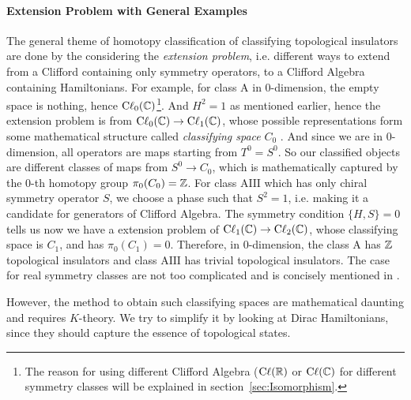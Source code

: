 \paragraph{Extension Problem with General Examples}
The general theme of homotopy classification of classifying topological
insulators are done by the considering the \textit{extension problem}, i.e.
different ways to extend from a Clifford containing only symmetry operators, to
a Clifford Algebra containing Hamiltonians. For example, for class $\mathrm{A}$
in $0$-dimension, the empty space is nothing, hence
$\mathrm{C\ell}_{0}(\mathbb{C})$\footnote{The reason for using different Clifford
Algebra ($\mathrm{C\ell}(\mathbb{R})$ or $\mathrm{C\ell}(\mathbb{C})$ for different symmetry
classes will be explained in section~\ref{sec:Isomorphism}.}. And $H^2=1$ as
mentioned earlier, hence the extension problem is from
$\mathrm{C\ell}_{0}(\mathbb{C})\to \mathrm{C\ell}_{1}(\mathbb{C})$, whose possible
representations form some mathematical structure called \textit{classifying
space} $C_0$ \cite{Morimoto2013}. And since we are in $0$-dimension, all
operators are maps starting from $T^0=S^0$. So our classified objects are
different classes of maps from $S^0\to C_0$, which is mathematically captured by
the $0$-th homotopy group $\pi_0(C_0)=\mathbb{Z}$. For class $\mathrm{AIII}$ which has
only chiral symmetry operator $S$, we choose a phase such that $S^2=1$, i.e.
making it a candidate for generators of Clifford Algebra. The symmetry condition
$\{H,S\}=0$ tells us now we have a extension problem of
$\mathrm{C\ell}_{1}(\mathbb{C})\to \mathrm{C\ell}_{2}(\mathbb{C})$, whose classifying space is
$C_1$, and has $\pi_0(C_1)=0$. Therefore, in $0$-dimension, the class
$\mathrm{A}$ has $\mathbb{Z}$ topological insulators and class $\mathrm{AIII}$ has
trivial topological insulators. The case for real symmetry classes are not too
complicated and is concisely mentioned in \cite{Morimoto2013}.

However, the method to obtain such classifying spaces are mathematical daunting
and requires $K$-theory. We try to simplify it by looking at Dirac Hamiltonians,
since they should capture the essence of topological states.

